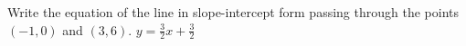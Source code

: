 {Write the equation of the line in slope-intercept form passing through the points $(-1,0)$ and $(3,6)$.}
{$y=\frac{3}{2}x + \frac{3}{2}$}
